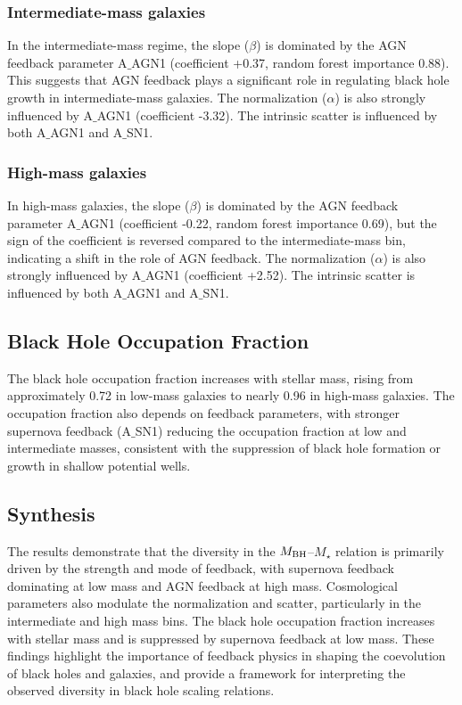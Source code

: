 \documentclass[twocolumn]{aastex631}
\begin{document}
\subsubsection{Intermediate-mass galaxies}

In the intermediate-mass regime, the slope ($\beta$) is dominated by the AGN feedback parameter A\ensuremath{\_}{AGN1} (coefficient +0.37, random forest importance 0.88). This suggests that AGN feedback plays a significant role in regulating black hole growth in intermediate-mass galaxies. The normalization ($\alpha$) is also strongly influenced by A\ensuremath{\_}{AGN1} (coefficient -3.32). The intrinsic scatter is influenced by both A\ensuremath{\_}{AGN1} and A\ensuremath{\_}{SN1}.

\subsubsection{High-mass galaxies}

In high-mass galaxies, the slope ($\beta$) is dominated by the AGN feedback parameter A\ensuremath{\_}{AGN1} (coefficient -0.22, random forest importance 0.69), but the sign of the coefficient is reversed compared to the intermediate-mass bin, indicating a shift in the role of AGN feedback. The normalization ($\alpha$) is also strongly influenced by A\ensuremath{\_}{AGN1} (coefficient +2.52). The intrinsic scatter is influenced by both A\ensuremath{\_}{AGN1} and A\ensuremath{\_}{SN1}.

\subsection{Black Hole Occupation Fraction}

The black hole occupation fraction increases with stellar mass, rising from approximately 0.72 in low-mass galaxies to nearly 0.96 in high-mass galaxies. The occupation fraction also depends on feedback parameters, with stronger supernova feedback (A\ensuremath{\_}{SN1}) reducing the occupation fraction at low and intermediate masses, consistent with the suppression of black hole formation or growth in shallow potential wells.

\subsection{Synthesis}

The results demonstrate that the diversity in the $M_{\rm BH}$--$M_{\star}$ relation is primarily driven by the strength and mode of feedback, with supernova feedback dominating at low mass and AGN feedback at high mass. Cosmological parameters also modulate the normalization and scatter, particularly in the intermediate and high mass bins. The black hole occupation fraction increases with stellar mass and is suppressed by supernova feedback at low mass. These findings highlight the importance of feedback physics in shaping the coevolution of black holes and galaxies, and provide a framework for interpreting the observed diversity in black hole scaling relations.
\end{document}
